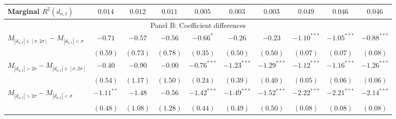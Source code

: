\begin{tabular}{lccccccccc}
  Marginal $R^2(d_{n,t})$ & $0.014$ & $0.012$ & $0.011$ & $0.005$ & $0.003$ & $0.003$ & $0.049$ & $0.046$ & $0.046$ \\ 
   \hline \multicolumn{10}{c}{Panel B: Coefficient differences} \\
 \hline$M_{|d_{n,t}| \in [\sigma, 2\sigma]} - M_{|d_{n,t}| < \sigma}$ & $-0.71$ & $-0.57$ & $-0.56$ & $-0.66^{*}$ & $-0.26$ & $-0.23$ & $-1.10^{***}$ & $-1.05^{***}$ & $-0.88^{***}$ \\ 
   & $(0.59)$ & $(0.73)$ & $(0.78)$ & $(0.35)$ & $(0.50)$ & $(0.50)$ & $(0.07)$ & $(0.07)$ & $(0.08)$ \\ 
  $M_{|d_{n,t}| > 2 \sigma} - M_{|d_{n,t}| \in [\sigma, 2\sigma]}$ & $-0.40$ & $-0.90$ & $-0.00$ & $-0.76^{***}$ & $-1.23^{***}$ & $-1.29^{***}$ & $-1.12^{***}$ & $-1.16^{***}$ & $-1.26^{***}$ \\ 
   & $(0.54)$ & $(1.17)$ & $(1.50)$ & $(0.24)$ & $(0.39)$ & $(0.40)$ & $(0.05)$ & $(0.06)$ & $(0.06)$ \\ 
  $M_{|d_{n,t}| > 2 \sigma} - M_{|d_{n,t}| < \sigma}$ & $-1.11^{**}$ & $-1.48$ & $-0.56$ & $-1.42^{***}$ & $-1.49^{***}$ & $-1.52^{***}$ & $-2.22^{***}$ & $-2.21^{***}$ & $-2.14^{***}$ \\ 
   & $(0.48)$ & $(1.08)$ & $(1.28)$ & $(0.44)$ & $(0.49)$ & $(0.50)$ & $(0.08)$ & $(0.08)$ & $(0.08)$ \\ 
   \hline 
\end{tabular}
